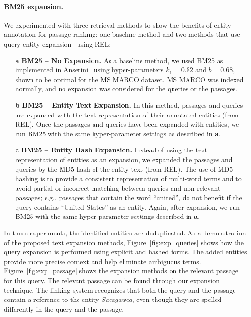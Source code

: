 \paragraph{BM25 expansion.} We experimented with three retrieval methods to show the benefits of entity annotation for passage ranking: one baseline method and two methods that use query entity expansion~\citep{Shehata} using REL:

\begin{itemize}
	\item[\textbf{a}] \textbf{BM25 -- No Expansion.} As a baseline method, we used BM25 as implemented in Anserini~\cite{Kamphuis2020BM25} using hyper-parameters $k_1=0.82$ and $b=0.68$, shown to be optimal for the MS MARCO dataset. MS MARCO was indexed normally, and no expansion was considered for the queries or the passages. 
	\item[\textbf{b}] \textbf{BM25 -- Entity Text Expansion.} In this method, passages and queries are expanded with the text representation of their annotated entities (from REL). Once the passages and queries have been expanded with entities, we run BM25 with the same hyper-parameter settings as described in \textbf{a}.
	\item[\textbf{c}] \textbf{BM25 -- Entity Hash Expansion.} Instead of using the text representation of entities as an expansion, we expanded the passages and queries by the MD5 hash of the entity text (from REL). The use of MD5 hashing is to provide a consistent representation of multi-word terms and to avoid partial or incorrect matching between queries and non-relevant passages; e.g., passages that contain the word ``united'', do not benefit if the query contains ``United States'' as an entity. Again, after expansion, we run BM25 with the same hyper-parameter settings described in \textbf{a}.
\end{itemize}
In these experiments, the identified entities are deduplicated. As a demonstration of the proposed text expansion methods, Figure~\ref{fig:exp_queries} shows how the query expansion is performed using explicit and hashed forms. The added entities provide more precise context and help eliminate ambiguous terms. Figure~\ref{fig:exp_passage} shows the expansion methods on the relevant passage for this query. The relevant passage can be found through our expansion technique. The linking system recognizes that both the query and the passage contain a reference to the entity \emph{Sacagawea}, even though they are spelled differently in the query and the passage.

